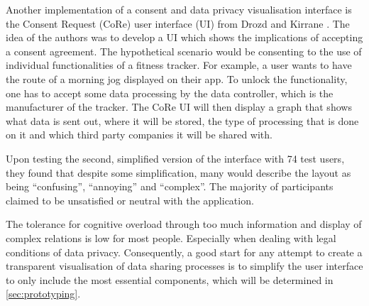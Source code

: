 \documentclass[../paper.tex]{subfiles}
\begin{document}
  Another implementation of a consent and data privacy visualisation interface
  is the Consent Request (CoRe) user interface (UI) from Drozd and Kirrane
  \cite{cure2020}.  The idea of the authors was to develop a
  UI which shows the implications of accepting a consent agreement. The
  hypothetical scenario would be consenting to the use of individual
  functionalities of a fitness tracker. For example, a user wants to have the
  route of a morning jog displayed on their app. To unlock the functionality, one
  has to accept some data processing by the data controller, which is the
  manufacturer of the tracker. The CoRe UI \cite{cure2020} will then display a
  graph that shows what data is sent out, where it will be stored, the type of
  processing that is done on it and which third party companies it will be
  shared with.

  Upon testing the second, simplified version of the interface with 74 test users, they 
  found that despite some simplification, many would describe the layout 
  as being “confusing”, “annoying” and “complex”. The majority of participants
  claimed to be unsatisfied or neutral with the application.
  
  The tolerance for cognitive overload through too much information and display 
  of complex relations is low for most people. Especially when dealing with 
  legal conditions of data privacy. Consequently, a good start for any attempt
  to create a transparent visualisation of data sharing processes is to simplify
  the user interface to only include the most essential components, which will
  be determined in \cref{sec:prototyping}.
\end{document}
